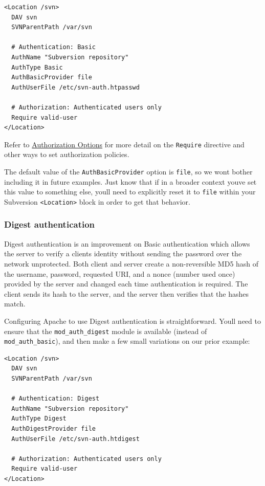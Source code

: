 \begin{verbatim}
<Location /svn>
  DAV svn
  SVNParentPath /var/svn

  # Authentication: Basic
  AuthName "Subversion repository"
  AuthType Basic
  AuthBasicProvider file
  AuthUserFile /etc/svn-auth.htpasswd

  # Authorization: Authenticated users only
  Require valid-user
</Location>
\end{verbatim}

Refer to \hyperref[svn.serverconfig.httpd.authz]{Authorization Options}
for more detail on the \texttt{Require} directive and other ways to set
authorization policies.

The default value of the \texttt{AuthBasicProvider} option is
\texttt{file}, so we won\textquotesingle t bother including it in future
examples. Just know that if in a broader context you\textquotesingle ve
set this value to something else, you\textquotesingle ll need to
explicitly reset it to \texttt{file} within your Subversion
\texttt{\textless{}Location\textgreater{}} block in order to get that
behavior.

\subsubsection{Digest
authentication}\label{svn.serverconfig.httpd.authn.digest}

Digest authentication is an improvement on Basic authentication which
allows the server to verify a client\textquotesingle s identity without
sending the password over the network unprotected. Both client and
server create a non-reversible MD5 hash of the username, password,
requested URI, and a nonce (number used once) provided by the server and
changed each time authentication is required. The client sends its hash
to the server, and the server then verifies that the hashes match.

Configuring Apache to use Digest authentication is straightforward.
You\textquotesingle ll need to ensure that the
\texttt{mod\_auth\_digest} module is available (instead of
\texttt{mod\_auth\_basic}), and then make a few small variations on our
prior example:

\begin{verbatim}
<Location /svn>
  DAV svn
  SVNParentPath /var/svn

  # Authentication: Digest
  AuthName "Subversion repository"
  AuthType Digest
  AuthDigestProvider file
  AuthUserFile /etc/svn-auth.htdigest

  # Authorization: Authenticated users only
  Require valid-user
</Location>
\end{verbatim}

